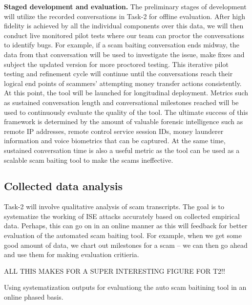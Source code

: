 \textbf{Staged development and evaluation.} The preliminary stages of development will utilize the
recorded conversations in Task-2 for offline evaluation. After high fidelity is achieved by all the
individual components over this data, we will then conduct live monitored pilot tests where our team can
proctor the conversations to identify bugs. For example, if a scam baiting conversation ends midway, the
data from that conversation will be used to investigate the issue, make fixes and subject the updated
version for more proctored testing. This iterative pilot testing and refinement cycle will continue until the
conversations reach their logical end points of scammers’ attempting money transfer actions consistently.
At this point, the tool will be launched for longitudinal deployment. Metrics such as sustained
conversation length and conversational milestones reached will be used to continuously evaluate the
quality of the tool. The ultimate success of this framework is determined by the amount of valuable
forensic intelligence such as remote IP addresses, remote control service session IDs, money launderer
information and voice biometrics that can be captured. At the same time, sustained conversation time is
also a useful metric as the tool can be used as a scalable scam baiting tool to make the scams ineffective.

\subsection{Collected data analysis}

Task-2 will involve qualitative analysis of scam transcripts. The goal is to systematize the working of ISE attacks accurately based on collected empirical data. Perhaps, this can go on in an online manner as this will feedback for better evaluation of the automated scam baiting tool. For example, when we get some good amount of data, we chart out milestones for a scam -- we can then go ahead and use them for making evaluation critieria.

ALL THIS MAKES FOR A SUPER INTERESTING FIGURE FOR T2!!


 Using systematization outputs for evaluationg the auto scam baitining tool in an online phased basis. 
